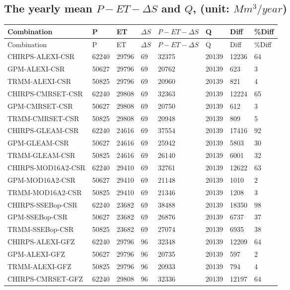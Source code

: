 \documentclass{article}%
\begin{document}
%
\newpage%
\RaggedRight%
\subsection*{The yearly mean $P-ET-\Delta S$ and $Q$, (unit: $Mm^3/year$)}%
\label{subsec:TheyearlymeanP{-}ET{-}DeltaSandQ,(unitMm3/year)}%
%
\begin{longtable}{|l|l|l|l|l|l|l|l|}%
\hline%
\textbf{Combination}&\textbf{P}&\textbf{ET}&\textbf{$\Delta S$}&\textbf{$P-ET-\Delta S$}&\textbf{Q}&\textbf{Diff}&\textbf{\%Diff}\\%
\hline%
\endfirsthead%
\hline%
Combination&P&ET&$\Delta S$&$P-ET-\Delta S$&Q&Diff&\%Diff\\%
\hline%
\endhead%
\hline%
\endfoot%
CHIRPS-ALEXI-CSR&62240&29796&69&32375&20139&12236&64\\%
GPM-ALEXI-CSR&50627&29796&69&20762&20139&623&3\\%
TRMM-ALEXI-CSR&50825&29796&69&20960&20139&821&4\\%
CHIRPS-CMRSET-CSR&62240&29808&69&32363&20139&12224&65\\%
GPM-CMRSET-CSR&50627&29808&69&20750&20139&612&3\\%
TRMM-CMRSET-CSR&50825&29808&69&20948&20139&809&5\\%
CHIRPS-GLEAM-CSR&62240&24616&69&37554&20139&17416&92\\%
GPM-GLEAM-CSR&50627&24616&69&25942&20139&5803&30\\%
TRMM-GLEAM-CSR&50825&24616&69&26140&20139&6001&32\\%
CHIRPS-MOD16A2-CSR&62240&29410&69&32761&20139&12622&63\\%
GPM-MOD16A2-CSR&50627&29410&69&21148&20139&1010&2\\%
TRMM-MOD16A2-CSR&50825&29410&69&21346&20139&1208&3\\%
CHIRPS-SSEBop-CSR&62240&23682&69&38488&20139&18350&98\\%
GPM-SSEBop-CSR&50627&23682&69&26876&20139&6737&37\\%
TRMM-SSEBop-CSR&50825&23682&69&27074&20139&6935&38\\%
CHIRPS-ALEXI-GFZ&62240&29796&96&32348&20139&12209&64\\%
GPM-ALEXI-GFZ&50627&29796&96&20735&20139&597&2\\%
TRMM-ALEXI-GFZ&50825&29796&96&20933&20139&794&4\\%
CHIRPS-CMRSET-GFZ&62240&29808&96&32336&20139&12197&64\\%

\end{longtable}
\end{document}
